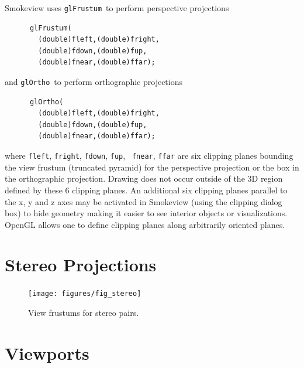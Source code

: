 \documentclass[11pt,twoside]{book}
\begin{document}
Smokeview uses {\tt glFrustum}\ to perform perspective projections
\begin{verbatim}
      glFrustum(
        (double)fleft,(double)fright,
        (double)fdown,(double)fup,
        (double)fnear,(double)ffar);
\end{verbatim}
and {\tt glOrtho}\ to perform orthographic projections
\begin{verbatim}
      glOrtho(
        (double)fleft,(double)fright,
        (double)fdown,(double)fup,
        (double)fnear,(double)ffar);
\end{verbatim}

where {\tt fleft}, {\tt fright}, {\tt fdown}, {\tt fup}, {\tt
fnear}, {\tt ffar} are six clipping planes bounding the view
frustum (truncated pyramid) for the perspective projection or the
box in the orthographic projection.  Drawing does not occur
outside of the 3D region defined by these 6 clipping planes. An
additional six clipping planes parallel to the x, y and z axes may
be activated in Smokeview (using the clipping dialog box) to hide
geometry making it easier to see interior objects or
visualizations.  OpenGL allows one to define clipping planes along
arbitrarily oriented planes.

\section{Stereo Projections}

\begin{figure}[t]
\begin{center}
\texttt{[image: figures/fig\_stereo]}
\end{center}
\caption{View frustums for stereo pairs.}
 \label{figstereo}
\end{figure}

\section{Viewports}
\end{document}

